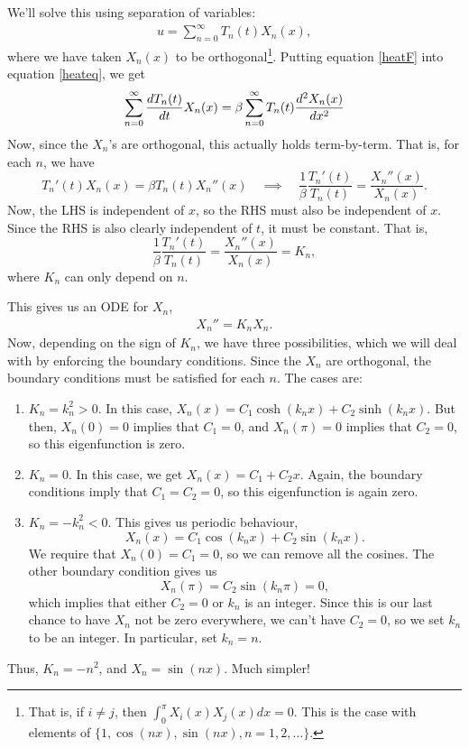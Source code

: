 \documentclass[10pt,driverfallback=hypertex]{report}
\begin{document}
We'll solve this using separation of variables:
\begin{eqnarray}
  \label{heatF}
  u = \sum_{n=0}^\infty T_n(t) X_n(x),
\end{eqnarray}
where we have taken $X_n(x)$ to be orthogonal\footnote{That is, if
  $i\neq j$, then $\int_0^\pi X_i(x) X_j(x) dx =0.$ This is the case
  with elements of $\{1,\cos(nx),\sin(nx),n=1,2,\dots \}$.}.  Putting
equation \eqref{heatF} into equation \eqref{heateq}, we get
\begin{eqnarray}
  \label{heats}
  \sum_{n=0}^\infty \frac{dT_n(t)}{dt}X_n(x)
  =\beta\sum_{n=0}^\infty T_n(t)\frac{d^2 X_n(x)}{d x^2}
\end{eqnarray}
Now, since the $X_n$'s are orthogonal, this actually holds term-by-term. That
is, for each $n$, we have
\begin{dmath*}[compact]
  T_n'(t)X_n(x) = \beta  T_n(t)X_n''(x)
  \quad \implies \quad
  \frac{1}{\beta}\frac{T_n'(t)}{T_n(t)}= \frac{X_n''(x)}{X_n(x)}.
\end{dmath*}
Now, the LHS is independent of $x$, so the RHS must also be independent of $x$.
Since the RHS is also clearly independent of $t$, it must be constant. That is,
\begin{dmath*}[compact]
  \frac{1}{\beta}\frac{T_n'(t)}{T_n(t)}
  = \frac{X_n''(x)}{X_n(x)} 
  = K_n,
\end{dmath*}
where $K_n$ can only depend on $n$.

This gives us an ODE for $X_n$,
\begin{eqnarray}
  \label{Eigenfunction}
  X_n'' = K_n X_n.
\end{eqnarray}
Now, depending on the sign of $K_n$, we have three possibilities, which we will
deal with by enforcing the boundary conditions. Since the $X_n$ are orthogonal,
the boundary conditions must be satisfied for each $n$. The cases are:
\begin{enumerate}
  \item $K_n=k_n^2 > 0$. In this case, $X_n(x)= C_1 \cosh(k_n x) +C_2
    \sinh(k_n x)$.  But then, $X_n(0)=0$ implies that $C_1=0$, and
    $X_n(\pi)=0$ implies that $C_2=0$, so this eigenfunction is zero.
  \item $K_n = 0$. In this case, we get $X_n(x)=C_1 +C_2 x$. Again,
    the boundary conditions imply that $C_1=C_2=0$, so this
    eigenfunction is again zero.
  \item $K_n =-k_n^2 < 0$. This gives us periodic behaviour,
    \begin{dmath*}
      X_n(x)=C_1\cos(k_nx) + C_2\sin(k_nx).
    \end{dmath*}
    We require that $X_n(0)=C_1=0$, so we can remove all the cosines. The
    other boundary condition gives us
    \begin{dmath*}[compact]
      X_n(\pi)=C_2\sin(k_n\pi)=0,
    \end{dmath*}
    which implies that either $C_2=0$ or $k_n$ is an integer. Since this is
    our last chance to have $X_n$ not be zero everywhere, we can't have $C_2=0$,
    so we set $k_n$ to be an integer. In particular, set $k_n=n$.
\end{enumerate}
Thus, $K_n=-n^2$, and $X_n= \sin(nx)$. Much simpler!
\end{document}
